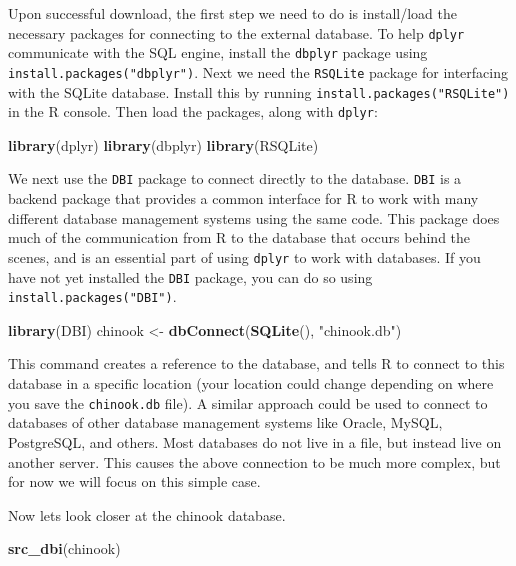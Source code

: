 \documentclass[
]{krantz}
\makeatletter
\newenvironment{Shaded}{\begin{snugshade}}{\end{snugshade}}
\newcommand{\KeywordTok}[1]{\textcolor[rgb]{0.27,0.27,0.27}{\textbf{#1}}}
\newcommand{\NormalTok}[1]{#1}
\newcommand{\StringTok}[1]{\textcolor[rgb]{0.5,0.5,0.5}{#1}}
\newenvironment{kframe}{%
\medskip{}
\setlength{\fboxsep}{.8em}
 \def\at@end@of@kframe{}%
 \ifinner\ifhmode%
  \def\at@end@of@kframe{\end{minipage}}%
  \begin{minipage}{\columnwidth}%
 \fi\fi%
 \def\FrameCommand##1{\hskip\@totalleftmargin \hskip-\fboxsep
 \colorbox{shadecolor}{##1}\hskip-\fboxsep
     \hskip-\linewidth \hskip-\@totalleftmargin \hskip\columnwidth}%
 \MakeFramed {\advance\hsize-\width
   \@totalleftmargin\z@ \linewidth\hsize
   \@setminipage}}%
 {\par\unskip\endMakeFramed%
 \at@end@of@kframe}
\renewenvironment{Shaded}{\begin{kframe}}{\end{kframe}}
\makeatother
\begin{document}
Upon successful download, the first step we need to do is install/load the necessary packages for connecting to the external database. To help \texttt{dplyr} communicate with the SQL engine, install the \texttt{dbplyr} package using \texttt{install.packages("dbplyr")}. Next we need the \texttt{RSQLite} package for interfacing with the SQLite database. Install this by running \texttt{install.packages("RSQLite")} in the R console. Then load the packages, along with \texttt{dplyr}:

\begin{Shaded}
\begin{Highlighting}[]
\KeywordTok{library}\NormalTok{(dplyr)}
\KeywordTok{library}\NormalTok{(dbplyr)}
\KeywordTok{library}\NormalTok{(RSQLite)}
\end{Highlighting}
\end{Shaded}

We next use the \texttt{DBI} package to connect directly to the database. \texttt{DBI} is a backend package that provides a common interface for R to work with many different database management systems using the same code. This package does much of the communication from R to the database that occurs behind the scenes, and is an essential part of using \texttt{dplyr} to work with databases. If you have not yet installed the \texttt{DBI} package, you can do so using \texttt{install.packages("DBI")}.

\begin{Shaded}
\begin{Highlighting}[]
\KeywordTok{library}\NormalTok{(DBI)}
\NormalTok{chinook \textless{}{-}}\StringTok{ }\KeywordTok{dbConnect}\NormalTok{(}\KeywordTok{SQLite}\NormalTok{(), }\StringTok{"chinook.db"}\NormalTok{)}
\end{Highlighting}
\end{Shaded}

This command creates a reference to the database, and tells R to connect to this database in a specific location (your location could change depending on where you save the \texttt{chinook.db} file). A similar approach could be used to connect to databases of other database management systems like Oracle, MySQL, PostgreSQL, and others. Most databases do not live in a file, but instead live on another server. This causes the above connection to be much more complex, but for now we will focus on this simple case.

Now lets look closer at the chinook database.

\begin{Shaded}
\begin{Highlighting}[]
\KeywordTok{src\_dbi}\NormalTok{(chinook)}
\end{Highlighting}
\end{Shaded}
\end{document}
